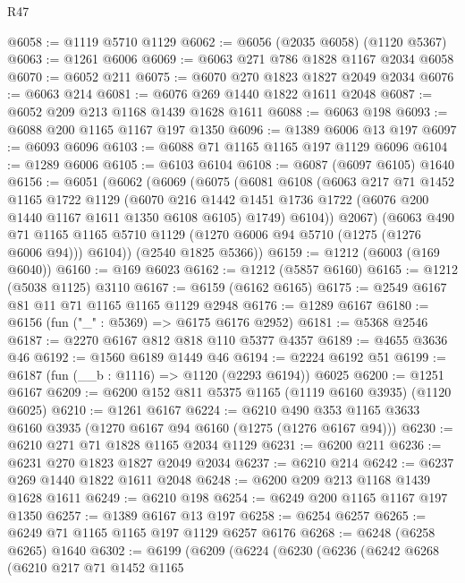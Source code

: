 \begin{lexlean}{R47}
\begin{coremodule}
@6058 := @1119 @5710 @1129
@6062 := @6056 (@2035 @6058) (@1120 @5367)
@6063 := @1261 @6006
@6069 := @6063 @271 @786 @1828 @1167 @2034 @6058
@6070 := @6052 @211
@6075 := @6070 @270 @1823 @1827 @2049 @2034
@6076 := @6063 @214
@6081 := @6076 @269 @1440 @1822 @1611 @2048
@6087 := @6052 @209 @213 @1168 @1439 @1628 @1611
@6088 := @6063 @198
@6093 := @6088 @200 @1165 @1167 @197 @1350
@6096 := @1389 @6006 @13 @197
@6097 := @6093 @6096
@6103 := @6088 @71 @1165 @1165 @197 @1129 @6096
@6104 := @1289 @6006
@6105 := @6103 @6104
@6108 := @6087 (@6097 @6105) @1640
@6156 := @6051
    (@6062
      (@6069
        (@6075
          (@6081
            @6108
            (@6063
              @217
              @71
              @1452
              @1165
              @1722
              @1129
              (@6070
                @216
                @1442
                @1451
                @1736
                @1722
                (@6076 @200 @1440 @1167 @1611 @1350 @6108 @6105)
                @1749)
              @6104))
          @2067)
        (@6063
          @490
          @71
          @1165
          @1165
          @5710
          @1129
          (@1270 @6006 @94 @5710 (@1275 (@1276 @6006 @94)))
          @6104))
      (@2540 @1825 @5366))
@6159 := @1212 (@6003 (@169 @6040))
@6160 := @169 @6023
@6162 := @1212 (@5857 @6160)
@6165 := @1212 (@5038 @1125) @3110
@6167 := @6159 (@6162 @6165)
@6175 := @2549 @6167 @81 @11 @71 @1165 @1165 @1129 @2948
@6176 := @1289 @6167
@6180 := @6156 (fun ("_" : @5369) => @6175 @6176 @2952)
@6181 := @5368 @2546
@6187 := @2270 @6167 @812 @818 @110 @5377 @4357
@6189 := @4655 @3636 @46
@6192 := @1560 @6189 @1449 @46
@6194 := @2224 @6192 @51
@6199 := @6187 (fun (__b : @1116) => @1120 (@2293 @6194)) @6025
@6200 := @1251 @6167
@6209 := @6200 @152 @811 @5375 @1165 (@1119 @6160 @3935) (@1120 @6025)
@6210 := @1261 @6167
@6224 := @6210 @490 @353 @1165 @3633 @6160 @3935 (@1270 @6167 @94 @6160 (@1275 (@1276 @6167 @94)))
@6230 := @6210 @271 @71 @1828 @1165 @2034 @1129
@6231 := @6200 @211
@6236 := @6231 @270 @1823 @1827 @2049 @2034
@6237 := @6210 @214
@6242 := @6237 @269 @1440 @1822 @1611 @2048
@6248 := @6200 @209 @213 @1168 @1439 @1628 @1611
@6249 := @6210 @198
@6254 := @6249 @200 @1165 @1167 @197 @1350
@6257 := @1389 @6167 @13 @197
@6258 := @6254 @6257
@6265 := @6249 @71 @1165 @1165 @197 @1129 @6257 @6176
@6268 := @6248 (@6258 @6265) @1640
@6302 := @6199
    (@6209
      (@6224
        (@6230
          (@6236
            (@6242
              @6268
              (@6210
                @217
                @71
                @1452
                @1165

\end{coremodule}
\end{lexlean}
